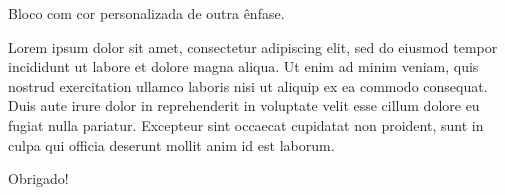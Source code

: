 \documentclass[aspectratio=169]{beamer}
\begin{document}
\begin{frame}[standout]
  \begin{standoutbox}[matematica300]
    Bloco com cor personalizada de outra ênfase.
  \end{standoutbox}
\end{frame}

\begin{frame}[standout]
  \begin{standoutbox}[computacao300]
    Lorem ipsum dolor sit amet, consectetur adipiscing elit, sed do eiusmod tempor incididunt ut labore et dolore magna aliqua. Ut enim ad minim veniam, quis nostrud exercitation ullamco laboris nisi ut aliquip ex ea commodo consequat. Duis aute irure dolor in reprehenderit in voluptate velit esse cillum dolore eu fugiat nulla pariatur. Excepteur sint occaecat cupidatat non proident, sunt in culpa qui officia deserunt mollit anim id est laborum.
  \end{standoutbox}
\end{frame}

\begin{frame}[standout]
  \begin{standoutbox}
    Obrigado!
  \end{standoutbox}
\end{frame}
\end{document}
